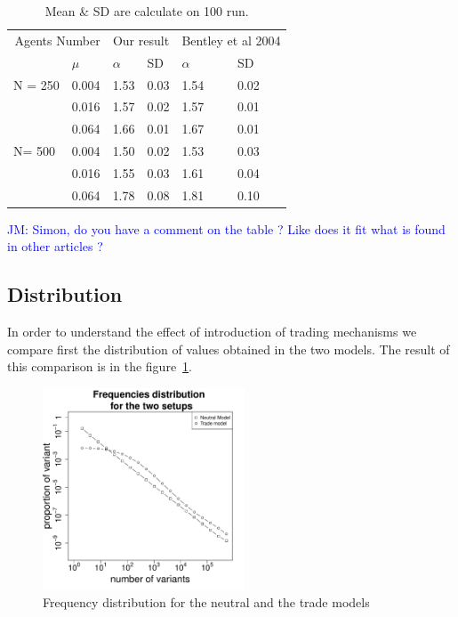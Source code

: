 \documentclass{wscpaperproc}
\newcommand{\memo}[2]{\textcolor{#1}{#2}}
\newcommand{\jm}[1]{\memo{blue}{JM: #1\\}}
\begin{document}
\begin{table}[h]
	\centering
	\begin{tabular}{ll|llll}
		\multicolumn{2}{r}{Agents Number}&\multicolumn{2}{c}{Our result}&\multicolumn{2}{c}{Bentley et al 2004}\\
			&$\mu$ & $\alpha$ & SD&$\alpha$&SD\\\hline
		N = 250	&0.004&1.53&0.03&1.54&0.02\\
			&0.016&1.57&0.02&1.57&0.01\\
			&0.064&1.66&0.01&1.67&0.01\\\hline
		N= 500	&0.004&1.50&0.02&1.53&0.03\\
			&0.016&1.55&0.03&1.61&0.04\\
			&0.064&1.78&0.08&1.81&0.10\\
	\end{tabular}
	\caption{Mean \& SD are calculate on 100 run.}
	\label{tab:mualpha}
\end{table}

\jm{Simon, do you have a comment on the table ? Like does it fit what is found in other articles ?}

\subsection{Distribution}

In order to understand the effect of introduction of trading mechanisms we compare first the distribution of values obtained in the two models. The result of this comparison is in the figure~\ref{fig:2setDi}. 

\begin{figure}[H]
	\begin{center}
		\includegraphics[width=6cm]{img/2SetupDistrib.pdf}
	\end{center}
	\caption{Frequency distribution for the neutral and the trade models}
	\label{fig:2setDi}
\end{figure}
\end{document}
